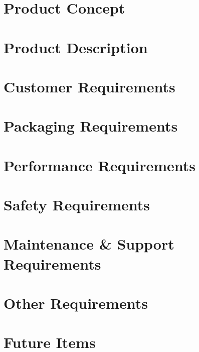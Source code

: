 \documentclass[11pt,letterpaper]{article}
\begin{document}
\setcounter{tocdepth}{3}
\tableofcontents
\newpage

\listoffigures
\newpage

\section{Product Concept}

\newpage
\section{Product Description}

\newpage
\section{Customer Requirements}

\newpage
\section{Packaging Requirements}

\newpage
\section{Performance Requirements}

\newpage
\section{Safety Requirements}

\newpage
\section{Maintenance \& Support Requirements}

\newpage
\section{Other Requirements}

\newpage
\section{Future Items}

\newpage


{}
\end{document}
